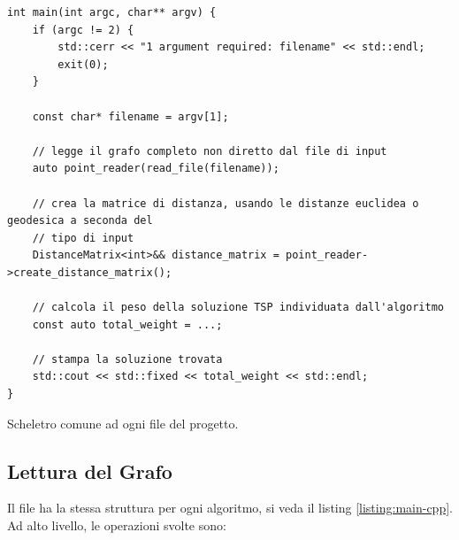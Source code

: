 \begin{listing}[!ht]
\begin{verbatim}
int main(int argc, char** argv) {
    if (argc != 2) {
        std::cerr << "1 argument required: filename" << std::endl;
        exit(0);
    }

    const char* filename = argv[1];

    // legge il grafo completo non diretto dal file di input
    auto point_reader(read_file(filename));

    // crea la matrice di distanza, usando le distanze euclidea o geodesica a seconda del
    // tipo di input
    DistanceMatrix<int>&& distance_matrix = point_reader->create_distance_matrix();

    // calcola il peso della soluzione TSP individuata dall'algoritmo
    const auto total_weight = ...;

    // stampa la soluzione trovata
    std::cout << std::fixed << total_weight << std::endl;
}
\end{verbatim}
\caption{Scheletro comune ad ogni file  del progetto.}
\label{listing:main-cpp}
\end{listing}

\subsection{Lettura del Grafo}

\noindent Il file  ha la stessa struttura per ogni algoritmo, si veda il listing \ref{listing:main-cpp}. Ad alto livello, le operazioni svolte sono:

